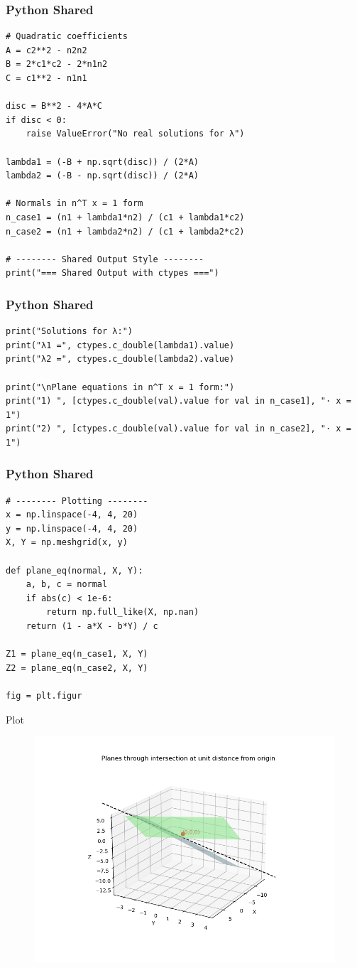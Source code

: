 \documentclass{beamer}
\begin{document}
\begin{frame}[fragile]
      \frametitle{Python Shared}
      \begin{lstlisting}
# Quadratic coefficients
A = c2**2 - n2n2
B = 2*c1*c2 - 2*n1n2
C = c1**2 - n1n1

disc = B**2 - 4*A*C
if disc < 0:
    raise ValueError("No real solutions for λ")

lambda1 = (-B + np.sqrt(disc)) / (2*A)
lambda2 = (-B - np.sqrt(disc)) / (2*A)

# Normals in n^T x = 1 form
n_case1 = (n1 + lambda1*n2) / (c1 + lambda1*c2)
n_case2 = (n1 + lambda2*n2) / (c1 + lambda2*c2)

# -------- Shared Output Style --------
print("=== Shared Output with ctypes ===")
\end{lstlisting}
\end{frame}
\begin{frame}[fragile]
      \frametitle{Python Shared}
      \begin{lstlisting}
print("Solutions for λ:")
print("λ1 =", ctypes.c_double(lambda1).value)
print("λ2 =", ctypes.c_double(lambda2).value)

print("\nPlane equations in n^T x = 1 form:")
print("1) ", [ctypes.c_double(val).value for val in n_case1], "· x = 1")
print("2) ", [ctypes.c_double(val).value for val in n_case2], "· x = 1")
\end{lstlisting}
\end{frame}
\begin{frame}[fragile]
      \frametitle{Python Shared}
      \begin{lstlisting}
# -------- Plotting --------
x = np.linspace(-4, 4, 20)
y = np.linspace(-4, 4, 20)
X, Y = np.meshgrid(x, y)

def plane_eq(normal, X, Y):
    a, b, c = normal
    if abs(c) < 1e-6:
        return np.full_like(X, np.nan)
    return (1 - a*X - b*Y) / c

Z1 = plane_eq(n_case1, X, Y)
Z2 = plane_eq(n_case2, X, Y)

fig = plt.figur

      \end{lstlisting}
\end{frame}
\begin{frame}{Plot}
\begin{figure}
    \centering
    \includegraphics[width=0.75\linewidth]{figs/Figure_1.png}
    \caption{}
    \label{fig:placeholder}
\end{figure}
    
\end{frame}
\end{document}
